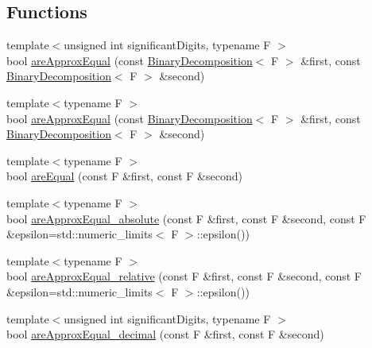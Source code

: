 \subsection*{Functions}
\begin{DoxyCompactItemize}
\item 
{\footnotesize template$<$unsigned int significant\+Digits, typename F $>$ }\\bool \hyperlink{namespaceMcCAD_1_1Tools_1_1FloatingPoint_a025cc7d8e1f64ef7e30b80e7cbe48f5c}{are\+Approx\+Equal} (const \hyperlink{classMcCAD_1_1Tools_1_1FloatingPoint_1_1BinaryDecomposition}{Binary\+Decomposition}$<$ F $>$ \&first, const \hyperlink{classMcCAD_1_1Tools_1_1FloatingPoint_1_1BinaryDecomposition}{Binary\+Decomposition}$<$ F $>$ \&second)
\item 
{\footnotesize template$<$typename F $>$ }\\bool \hyperlink{namespaceMcCAD_1_1Tools_1_1FloatingPoint_a2ceca8cd024594bb41c711017c06c433}{are\+Approx\+Equal} (const \hyperlink{classMcCAD_1_1Tools_1_1FloatingPoint_1_1BinaryDecomposition}{Binary\+Decomposition}$<$ F $>$ \&first, const \hyperlink{classMcCAD_1_1Tools_1_1FloatingPoint_1_1BinaryDecomposition}{Binary\+Decomposition}$<$ F $>$ \&second)
\item 
{\footnotesize template$<$typename F $>$ }\\bool \hyperlink{namespaceMcCAD_1_1Tools_1_1FloatingPoint_a478bf277e7b9bba336357573cfe7108b}{are\+Equal} (const F \&first, const F \&second)
\item 
{\footnotesize template$<$typename F $>$ }\\bool \hyperlink{namespaceMcCAD_1_1Tools_1_1FloatingPoint_a6c28bdd3911b4023aef2ba97905fca48}{are\+Approx\+Equal\+\_\+absolute} (const F \&first, const F \&second, const F \&epsilon=std\+::numeric\+\_\+limits$<$ F $>$\+::epsilon())
\item 
{\footnotesize template$<$typename F $>$ }\\bool \hyperlink{namespaceMcCAD_1_1Tools_1_1FloatingPoint_ab753b23c6fdf74bb173d8dd4a5e3d899}{are\+Approx\+Equal\+\_\+relative} (const F \&first, const F \&second, const F \&epsilon=std\+::numeric\+\_\+limits$<$ F $>$\+::epsilon())
\item 
{\footnotesize template$<$unsigned int significant\+Digits, typename F $>$ }\\bool \hyperlink{namespaceMcCAD_1_1Tools_1_1FloatingPoint_a22cef593ba3b803e2165812b75396f20}{are\+Approx\+Equal\+\_\+decimal} (const F \&first, const F \&second)
\item 

\end{DoxyCompactItemize}
